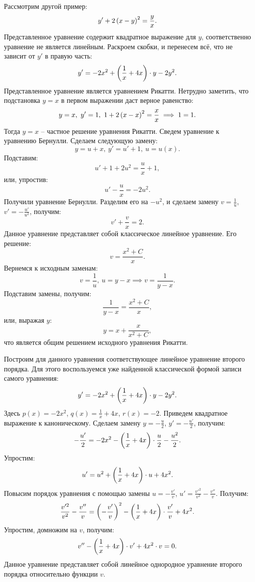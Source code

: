 		Рассмотрим другой пример:
		\[ y' + 2 \left( x - y \right)^2 = \frac{y}{x}. \]
		Представленное уравнение содержит квадратное выражение для $y$, соответственно уравнение не является линейным. Раскроем скобки, и перенесем всё, что не зависит от $y'$ в правую часть:
		\[ y' = -2x^2 + \left( \frac{1}{x} + 4x \right) \cdot y - 2y^2. \]
		Представленное уравнение является уравнением Рикатти. Нетрудно заметить, что подстановка $y = x$ в первом выражении даст верное равенство:
		\[ y = x, ~ y' = 1, ~ 1 + 2 \left( x - x \right)^2 = \frac{x}{x} \implies 1 = 1. \]
		Тогда $y = x$ -- частное решение уравнения Рикатти. Сведем уравнение к уравнению Бернулли. Сделаем следующую замену:
		\[ y = u + x, ~ y' = u' + 1, ~ u = u(x). \]
		Подставим:
		\[ u' + 1 + 2 u^2 = \frac{u}{x} + 1, \]
		или, упростив:
		\[ u' - \frac{u}{x} = -2u^2. \]
		Получили уравнение Бернулли. Разделим его на $-u^2$, и сделаем замену $v = \frac{1}{u}$, $v' = - \frac{u'}{u^2}$, получим:
		\[ v' + \frac{v}{x} = 2. \]
		Данное уравнение представляет собой классическое линейное уравнение. Его решение:
		\[ v = \frac{x^2 + C}{x}. \]
		Вернемся к исходным заменам:
		\[ v = \frac{1}{u}, ~ u = y - x \implies v = \frac{1}{y - x}. \]
		Подставим замены, получим:
		\[ \frac{1}{y - x} = \frac{x^2 + C}{x}, \]
		или, выражая $y$:
		\[ y = x + \frac{x}{x^2 + C}, \]
		что является общим решением исходного уравнения Рикатти.

		Построим для данного уравнения соответствующее линейное уравнение второго порядка. Для этого воспользуемся уже найденной классической формой записи самого уравнения:
		\[ y' = -2x^2 + \left( \frac{1}{x} + 4x \right) \cdot y - 2y^2. \]
		Здесь $p(x) = -2x^2$, $q(x) = \frac{1}{x} + 4x$, $r(x) = -2$. Приведем квадратное выражение к каноническому. Сделаем замену $y = -\frac{u}{2}$, $y' = -\frac{u'}{2}$, получим:
		\[ -\frac{u'}{2} = - 2x^2 - \left( \frac{1}{x} + 4x \right) \cdot \frac{u}{2} - \frac{u^2}{2}. \]
		Упростим:
		\[ u' = u^2 + \left( \frac{1}{x} + 4x \right) \cdot u + 4x^2. \]
		Повысим порядок уравнения с помощью замены $u = -\frac{v'}{v}$, $u' = \frac{v'^2}{v^2} - \frac{v''}{v}$. Получим:
		\[ \frac{v'^2}{v^2} - \frac{v''}{v} = \left( -\frac{v'}{v} \right)^2 - \left( \frac{1}{x} + 4x \right) \cdot \frac{v'}{v} + 4x^2. \]
		Упростим, домножим на $v$, получим:
		\[ v'' - \left( \frac{1}{x} + 4x \right) \cdot v' + 4x^2 \cdot v = 0. \]
		Данное уравнение представляет собой линейное однородное уравнение второго порядка относительно функции $v$.

	\pagebreak